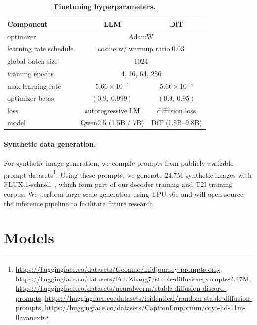 \documentclass[10pt,twocolumn,letterpaper]{article}
\begin{document}
\begin{table}[h]
\centering
\small
\setlength{\tabcolsep}{3.4pt}  %
\begin{tabular}{lcc}
\toprule
\textbf{Component}        & \textbf{LLM}                    & \textbf{DiT} \\ %
\midrule
optimizer                 & \multicolumn{2}{c}{AdamW} \\
learning rate schedule    & \multicolumn{2}{c}{cosine w/ warmup ratio $0.03$} \\
global batch size         & \multicolumn{2}{c}{$1024$} \\
training epochs           & \multicolumn{2}{c}{4, 16, 64, 256} \\
\midrule
max learning rate         & $5.66 \times 10^{-5}$               & $5.66 \times 10^{-4}$ \\
optimizer betas           & $(0.9,\ 0.999)$                 & $(0.9,\ 0.95)$ \\
loss                      & autoregressive LM               & diffusion loss \\
model                     & Qwen2.5 (1.5B / 7B)             & DiT (0.5B–9.8B) \\
\bottomrule
\end{tabular}
\caption{\textbf{Finetuning hyperparameters.}}
\label{tab:finetune_hyperparams}
\end{table}

\paragraph{Synthetic data generation.}
For synthetic image generation, we compile prompts from publicly available prompt datasets\footnote{\url{https://huggingface.co/datasets/Geonmo/midjourney-prompts-only},
\url{https://huggingface.co/datasets/FredZhang7/stable-diffusion-prompts-2.47M},
\url{https://huggingface.co/datasets/neuralworm/stable-diffusion-discord-prompts},
\url{https://huggingface.co/datasets/isidentical/random-stable-diffusion-prompts},
\url{https://huggingface.co/datasets/CaptionEmporium/coyo-hd-11m-llavanext}}. 
Using these prompts, we generate 24.7M synthetic images with FLUX.1-schnell~\citep{flux}, which form part of our decoder training and T2I training corpus. We perform large-scale generation using TPU-v6e and will open-source the inference pipeline to facilitate future research.




\section{Models}\label{appendix: model}
\end{document}
